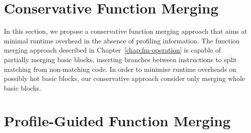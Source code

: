 \section{Conservative Function Merging}\label{sec:conservative-fm}

In this section, we propose a conservative function merging approach that aims at minimal runtime overhead in the absence of profiling information.
The function merging approach described in Chapter~\ref{chap:fm-operation} is capable of partially merging basic blocks, inserting branches between instructions to split matching from non-matching code.
In order to minimise runtime overheads on possibly hot basic blocks, our conservative approach consider only merging whole basic blocks.

\section{Profile-Guided Function Merging}
